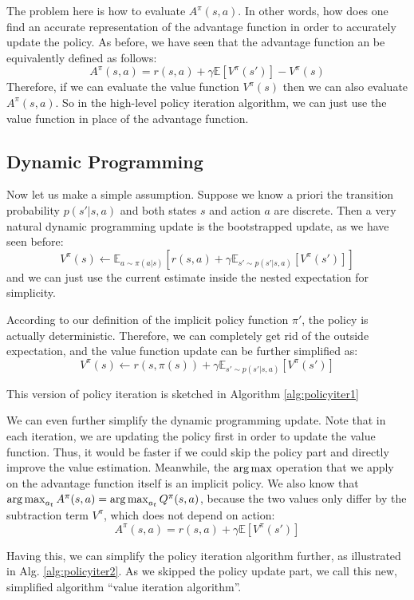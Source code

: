 The problem here is how to evaluate $A^\pi(s,a)$. In other words, how does one find an accurate representation of the advantage function in order to accurately update the policy. As before, we have seen that the advantage function an be equivalently defined as follows:
$$A^\pi(s,a) = r(s,a) + \gamma\mathbb{E}\left[V^\pi(s')\right]-V^\pi(s)$$
Therefore, if we can evaluate the value function $V^\pi(s)$ then we can also evaluate $A^\pi(s,a)$. So in the high-level policy iteration algorithm, we can just use the value function in place of the advantage function.

\subsection{Dynamic Programming}
Now let us make a simple assumption. Suppose we know a priori the transition probability $p(s'|s,a)$ and both states $s$ and action $a$ are discrete. Then a very natural dynamic programming update is the bootstrapped update, as we have seen before:
$$V^\pi(s)\leftarrow \mathbb{E}_{a\sim\pi(a|s)} \left[r(s,a) + \gamma\mathbb{E}_{s'\sim p(s'|s,a)}\left[V^\pi(s')\right]\right]$$
and we can just use the current estimate inside the nested expectation for simplicity. 

According to our definition of the implicit policy function $\pi'$, the policy is actually deterministic. Therefore, we can completely get rid of the outside expectation, and the value function update can be further simplified as:
$$V^\pi(s)\leftarrow r(s,\pi(s)) + \gamma\mathbb{E}_{s'\sim p(s'|s,a)}\left[V^\pi(s')\right]$$

This version of policy iteration is sketched in Algorithm \ref{alg:policyiter1}

We can even further simplify the dynamic programming update. Note that in each iteration, we are updating the policy first in order to update the value function. Thus, it would be faster if we could skip the policy part and directly improve the value estimation. Meanwhile, the $\operatorname*{arg\,max}$ operation that we apply on the advantage function itself is an implicit policy. We also know that $\operatorname*{arg\,max}_{a_t}A^\pi(s,a) = \operatorname*{arg\,max}_{a_t}Q^\pi(s,a)$, because the two values only differ by the subtraction term $V^\pi$, which does not depend on action:
$$A^\pi(s,a) = r(s,a) + \gamma\mathbb{E}\left[V^\pi(s')\right]$$

Having this, we can simplify the policy iteration algorithm further, as illustrated in Alg. \ref{alg:policyiter2}. As we skipped the policy update part, we call this new, simplified algorithm ``value iteration algorithm''.

